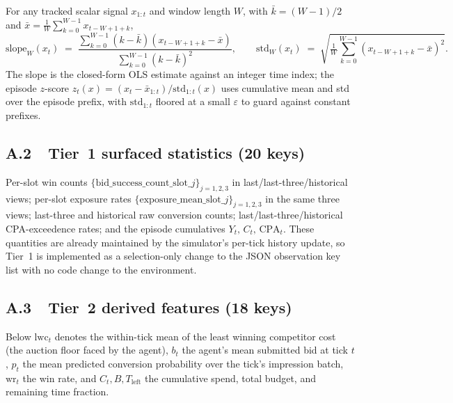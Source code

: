 \documentclass[11pt]{article}
\begin{document}
For any tracked scalar signal $x_{1:t}$ and window length $W$, with
$\bar k = (W-1)/2$ and $\bar x = \tfrac{1}{W}\sum_{k=0}^{W-1} x_{t-W+1+k}$,
\begin{equation}
  \mathrm{slope}_W(x_t) \;=\;
  \frac{\sum_{k=0}^{W-1}(k-\bar k)(x_{t-W+1+k}-\bar x)}
       {\sum_{k=0}^{W-1}(k-\bar k)^{2}},
  \qquad
  \mathrm{std}_W(x_t) \;=\;
  \sqrt{\tfrac{1}{W}\!\sum_{k=0}^{W-1}(x_{t-W+1+k}-\bar x)^{2}}.
\end{equation}
The slope is the closed-form OLS estimate against an integer time index;
the episode $z$-score $z_t(x)=(x_t-\bar x_{1:t})/\mathrm{std}_{1:t}(x)$
uses cumulative mean and std over the episode prefix, with
$\mathrm{std}_{1:t}$ floored at a small $\varepsilon$ to guard against
constant prefixes.

\subsection*{A.2\ \ Tier~1 surfaced statistics (20 keys)}

Per-slot win counts $\{\text{bid\_success\_count\_slot\_}j\}_{j=1,2,3}$ in
last/last-three/historical views; per-slot exposure rates
$\{\text{exposure\_mean\_slot\_}j\}_{j=1,2,3}$ in the same three views;
last-three and historical raw conversion counts; last/last-three/historical
CPA-exceedence rates; and the episode cumulatives
$Y_t,\,C_t,\,\mathrm{CPA}_t$. These quantities are already maintained by
the simulator's per-tick history update, so Tier~1 is implemented as a
selection-only change to the JSON observation key list with no code
change to the environment.

\subsection*{A.3\ \ Tier~2 derived features (18 keys)}

Below $\mathrm{lwc}_t$ denotes the within-tick mean of the least winning
competitor cost (the auction floor faced by the agent), $b_t$ the agent's
mean submitted bid at tick $t$, $p_t$ the mean predicted conversion
probability over the tick's impression batch, $\mathrm{wr}_t$ the win rate,
and $C_t,B,T_{\!\text{left}}$ the cumulative spend, total budget, and
remaining time fraction.
\end{document}
